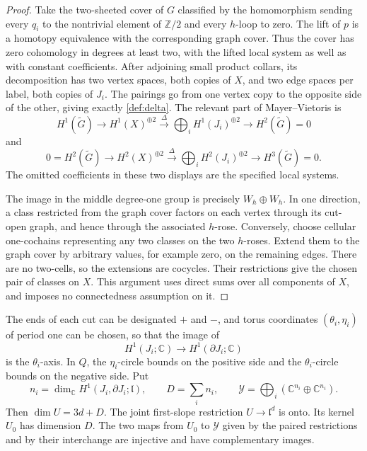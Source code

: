 \begin{proof}
Take the two-sheeted cover of \(G\) classified by the homomorphism
sending every \(q_i\) to the nontrivial element of \(\mathbb Z/2\)
and every \(h\)-loop to zero.  The lift of \(p\) is a homotopy
equivalence with the corresponding graph cover.  Thus the cover has
zero cohomology in degrees at least two, with the lifted local
system as well as with constant coefficients.  After adjoining
small product collars, its decomposition has two vertex spaces,
both copies of \(X\), and two edge spaces per label, both copies of
\(J_i\).  The pairings go from one vertex copy to the opposite side
of the other, giving exactly \eqref{def:delta}.  The relevant part of
Mayer--Vietoris is
\[
 H^1(\widetilde G)\longrightarrow H^1(X)^{\oplus2}
 \xrightarrow{\Delta}\bigoplus_i H^1(J_i)^{\oplus2}
 \longrightarrow H^2(\widetilde G)=0
\]
and
\[
 0=H^2(\widetilde G)\longrightarrow H^2(X)^{\oplus2}
 \xrightarrow{\Delta}\bigoplus_i H^2(J_i)^{\oplus2}
 \longrightarrow H^3(\widetilde G)=0 .
\]
The omitted coefficients in these two displays are the specified
local systems.

The image in the middle degree-one group is precisely
\(W_h\oplus W_h\).  In one direction, a class restricted from the
graph cover factors on each vertex through its cut-open graph,
and hence through the associated \(h\)-rose.  Conversely, choose
cellular one-cochains representing any two classes on the two
\(h\)-roses.  Extend them to the graph cover by arbitrary values,
for example zero, on the remaining edges.  There are no two-cells,
so the extensions are cocycles.  Their restrictions give the
chosen pair of classes on \(X\).  This argument uses direct sums
over all components of \(X\), and imposes no connectedness
assumption on it.
\end{proof}

\begin{lemma}
\label{def:slopes}
The ends of each cut can be designated \(+\) and \(-\), and torus
coordinates \((\theta_i,\eta_i)\) of period one can be chosen, so that
the image of
\[
 H^1(J_i;\mathbb C)\longrightarrow H^1(\partial J_i;\mathbb C)
\]
is the \(\theta_i\)-axis.  In \(Q\), the \(\eta_i\)-circle bounds on
the positive side and the \(\theta_i\)-circle bounds on the negative
side.  Put
\[
 n_i=\dim_{\mathbb C}H^1(J_i,\partial J_i;\mathfrak l),
 \qquad D=\sum_i n_i,
 \qquad
 \mathcal Y=\bigoplus_i(\mathbb C^{n_i}\oplus\mathbb C^{n_i}).
\]
Then \(\dim U=3d+D\).  The joint first-slope restriction
\(U\to\mathfrak l^d\) is onto.  Its kernel \(U_0\) has dimension \(D\).
The two maps from \(U_0\) to \(\mathcal Y\) given by the paired
restrictions and by their interchange are injective and have
complementary images.
\end{lemma}

